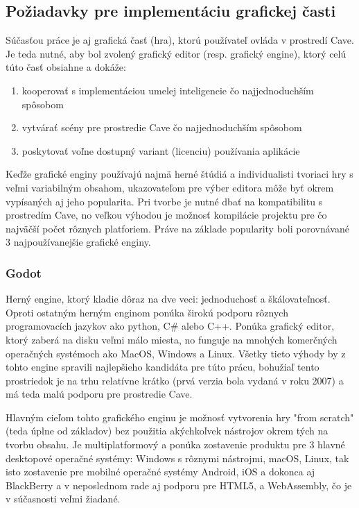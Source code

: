 \subsection{Požiadavky pre implementáciu grafickej časti}\label{subsec:requirements-game}

Súčasťou práce je aj grafická časť (hra), ktorú používateľ ovláda v prostredí Cave.
Je teda nutné, aby bol zvolený grafický editor (resp. grafický engine), ktorý celú túto časť obsiahne a dokáže:
\begin{enumerate}
    \item kooperovať s implementáciou umelej inteligencie čo najjednoduchším spôsobom
    \item vytvárať scény pre prostredie Cave čo najjednoduchším spôsobom
    \item poskytovať voľne dostupný variant (licenciu) používania aplikácie
\end{enumerate}
Keďže grafické enginy používajú najmä herné štúdiá a individualisti tvoriaci hry s veľmi variabilným obsahom,
ukazovateľom pre výber editora môže byť okrem vypísaných aj jeho popularita.
Pri tvorbe je nutné dbať na kompatibilitu s prostredím Cave, no veľkou výhodou je možnosť kompilácie projektu
pre čo najväčší počet rôznych platforiem.
Práve na základe popularity\cite{best_3d_game_engines} boli porovnávané 3 najpoužívanejšie grafické enginy.

\subsubsection{Godot}

Herný engine, ktorý kladie dôraz na dve veci: jednoduchosť a škálovateľnosť.\cite{game_engine_godot}
Oproti ostatným herným enginom ponúka širokú podporu rôznych programovacích jazykov ako python, C\# alebo C++.
Ponúka grafický editor, ktorý zaberá na disku veľmi málo miesta, no funguje na mnohých komerčných operačných systémoch
ako MacOS, Windows a Linux.
Všetky tieto výhody by z tohto engine spravili najlepšieho kandidáta pre túto prácu, bohužiaľ tento prostriedok je na
trhu relatívne krátko (prvá verzia bola vydaná v roku 2007) a má teda malú podporu pre prostredie Cave.

Hlavným cieľom tohto grafického enginu je možnosť vytvorenia hry "from scratch" (teda úplne od základov) bez použitia
akýchkoľvek nástrojov okrem tých na tvorbu obsahu.
Je multiplatformový a ponúka zostavenie produktu pre 3 hlavné desktopové operačné systémy: Windows s rôznymi nástrojmi,
macOS, Linux, tak isto zostavenie pre mobilné operačné systémy Android, iOS a dokonca aj BlackBerry a v neposlednom
rade aj podporu pre HTML5, a WebAssembly, čo je v súčasnosti veľmi žiadané.

